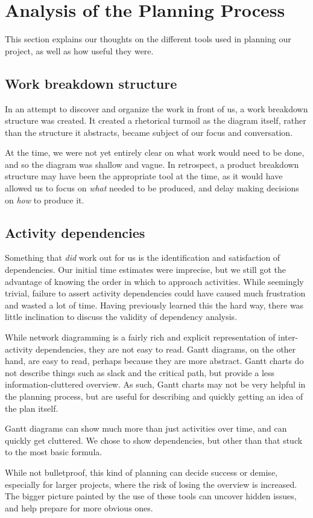 \section{Analysis of the Planning Process}
\label{sec:AnalysisPlanning}

This section explains our thoughts on the different tools used in planning our
project, as well as how useful they were.

\subsection{Work breakdown structure}
In an attempt to discover and organize the work in front of us, a work
breakdown structure was created. It created a rhetorical turmoil as the
diagram itself, rather than the structure it abstracts, became subject of our
focus and conversation.

At the time, we were not yet entirely clear on what work would need to be done,
and so the diagram was shallow and vague. In retrospect, a product breakdown
structure may have been the appropriate tool at the time, as it would have
allowed us to focus on \emph{what} needed to be produced, and delay making
decisions on \emph{how} to produce it\cite[ch.~8.3,~8.4]{caye}.

\subsection{Activity dependencies}
Something that \emph{did} work out for us is the identification and satisfaction
of dependencies. Our initial time estimates were imprecise, but we still got the
advantage of knowing the order in which to approach activities. While seemingly
trivial, failure to assert activity dependencies could have caused much
frustration and wasted a lot of time. Having previously learned this the hard way,
there was little inclination to discuss the validity of dependency analysis.

While network diagramming is a fairly rich and explicit representation of
inter-activity dependencies, they are not easy to read.  Gantt
diagrams, on the other hand, are easy to read, perhaps because they are more
abstract. Gantt charts do not describe things such as slack and the critical
path, but provide a less information-cluttered overview. As such, Gantt charts
may not be very helpful in the planning process, but are useful for describing
and quickly getting an idea of the plan itself.

Gantt diagrams can show much more than just activities over time, and can quickly
get cluttered\cite[ch.~8.6]{caye}. We chose to show dependencies, but other than
that stuck to the most basic formula.

While not bulletproof, this kind of planning can decide success or
demise\cite[ch.~8]{caye}, especially for larger projects, where the risk of
losing the overview is increased. The bigger picture painted by the use of
these tools can uncover hidden issues, and help prepare for more obvious ones.
